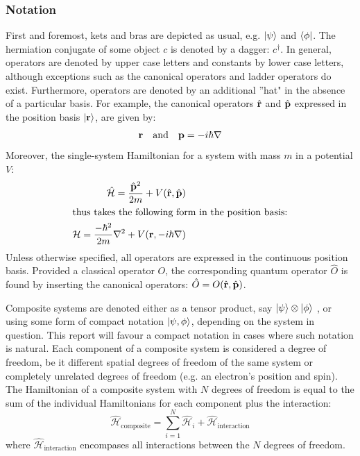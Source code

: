 \documentclass[nofootinbib,reprint,english]{revtex4-1}
\newcommand{\hatHH}{\hat{\mathcal{H}}}
\newcommand{\HH}{\mathcal{H}}
\begin{document}
\subsubsection{Notation}
First and foremost, kets and bras are depicted as usual, e.g. \(\ket{\psi}\) and \(\bra{\phi}\). The hermiation conjugate of some object \(c\) is denoted by a dagger: \(c^\dagger\). In general, operators are denoted by upper case letters and constants by lower case letters, although exceptions such as the canonical operators and ladder operators do exist. Furthermore, operators are denoted by an additional ''hat" in the absence of a particular basis. For example, the canonical operators \(\hat{\vb{r}}\) and \(\hat{\vb{p}}\) expressed in the position basis \(\ket{\vb{r}}\), are given by:
\begin{equation}
\vb{r}\qand\vb{p}=-i\hbar\nabla
\end{equation}
Moreover, the single-system Hamiltonian for a system with mass \(m\) in a potential \(V\):
\begin{subequations}
\begin{align}
\hatHH=\frac{\hat{\vb{p}}^2}{2m}+V(\hat{\vb{r}},\hat{\vb{p}})\\
\intertext{thus takes the following form in the position basis:}
\HH=\frac{-\hbar^2}{2m}\nabla^2+V(\vb{r},-i\hbar\nabla)
\end{align}
\end{subequations}
Unless otherwise specified, all operators are expressed in the continuous position basis. Provided a classical operator \(O\), the corresponding quantum operator \(\hat{O}\) is found by inserting the canonical operators: \(\hat{O}=O(\hat{\vb{r}},\hat{\vb{p}})\).

Composite systems are denoted either as a tensor product, say \(\ket{\psi}\otimes\ket{\phi}\) , or using some form of compact notation \(\ket{\psi,\phi}\), depending on the system in question. This report will favour a compact notation in cases where such notation is natural. Each component of a composite system is considered a degree of freedom, be it different spatial degrees of freedom of the same system or completely unrelated degrees of freedom (e.g. an electron's position and spin). The Hamiltonian of a composite system with \(N\) degrees of freedom is equal to the sum of the individual Hamiltonians for each component plus the interaction:
\begin{equation}\label{eq:Composite_Hamiltonian}
\hatHH_\text{composite}=\sum_{i=1}^N\hatHH_{i}+\hatHH_\text{interaction}
\end{equation}
where \(\hatHH_\text{interaction}\) encompases all interactions between the \(N\) degrees of freedom.
\end{document}
